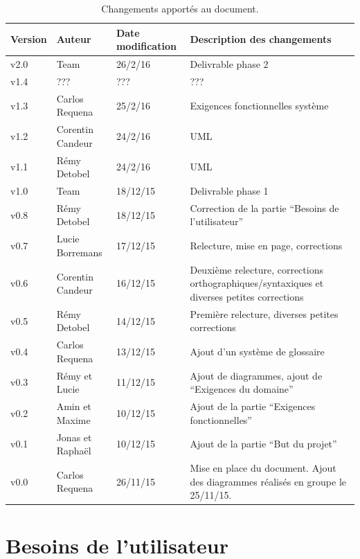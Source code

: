 \documentclass[11pt,a4paper]{article}
\begin{document}
\begin{table}[h]
  \centering
  \begin{tabular}[ht]{|l|l|l|p{18em}|}
    \hline
    \textbf{Version}
    & \textbf{Auteur}
    & \textbf{Date modification}
    & \textbf{Description des changements}\\ \hline \hline
    v2.0 & Team & 26/2/16 & Delivrable phase 2 \\ \hline
    v1.4 & ??? & ??? & ??? \\ \hline
    v1.3 & Carlos Requena & 25/2/16 & Exigences fonctionnelles système
    \\ \hline
    v1.2 & Corentin Candeur & 24/2/16 & UML \\ \hline
    v1.1 & Rémy Detobel & 24/2/16 & UML \\ \hline
    v1.0 & Team & 18/12/15 & Delivrable phase 1 \\ \hline
    v0.8 & Rémy Detobel & 18/12/15 & Correction de la partie ``Besoins de l'utilisateur'' \\ \hline
    v0.7 & Lucie Borremans & 17/12/15 & Relecture, mise en page, corrections \\ \hline
     v0.6 & Corentin Candeur & 16/12/15 & Deuxième relecture, corrections orthographiques/syntaxiques et diverses petites corrections \\ \hline
    v0.5 & Rémy Detobel & 14/12/15 & Première relecture, diverses petites corrections \\ \hline
    v0.4 & Carlos Requena  & 13/12/15 & Ajout d'un système de glossaire \\ \hline
    v0.3 & Rémy et Lucie  & 11/12/15 & Ajout de diagrammes, ajout de ``Exigences du domaine'' \\ \hline
    v0.2 & Amin et Maxime & 10/12/15 & Ajout de la partie ``Exigences fonctionnelles''\\ \hline
    v0.1 & Jonas et Raphaël & 10/12/15 & Ajout de la partie ``But du projet''\\ \hline
    v0.0 & Carlos Requena & 26/11/15 & Mise en place du document. Ajout des diagrammes réalisés en groupe le 25/11/15.\\ \hline
  \end{tabular}
  \caption{Changements apportés au document.}
  \label{tab:hist}
\end{table}


\glsaddall
\printnoidxglossaries


\section{Besoins de l'utilisateur}
\label{sec:besoins}
\end{document}
